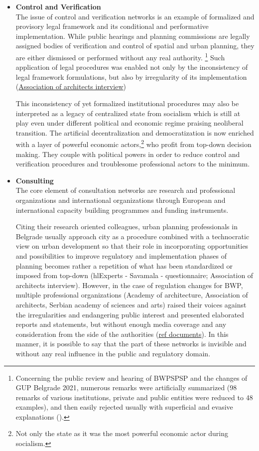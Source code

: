 \documentclass[11pt]{report}
\begin{document}
\begin{itemize}
\item \textbf{Control and Verification}
\\
The issue of control and verification networks is an example of formalized and provisory legal framework and its conditional and performative implementation. While public hearings and planning commissions are legally assigned bodies of verification and control of spatial and urban planning, they are either dismissed or performed without any real authority.
\footnote{Concerning the public review and hearing of BWPSPSP and the changes of GUP Belgrade 2021, numerous remarks were artificially summarized (98 remarks of various institutions, private and public entities were reduced to 48 examples), and then easily rejected usually with superficial and evasive explanations (\cite{Alternativni izvestaj}).}
Such application of legal procedures was enabled  not only by the inconsistency of legal framework formulations, but also by irregularity of its implementation (\href{}{Association of architects interview})

This inconsistency of yet formalized institutional procedures may also be interpreted as a legacy of centralized state from socialism which is still at play even under different political and economic regime praising neoliberal transition.
The artificial decentralization and democratization is now enriched with a layer of powerful economic actors,\footnote{Not only the state as it was  the most powerful economic actor during socialism.}
who profit from top-down decision making.
They couple with political powers in order to reduce control and verification procedures and troublesome professional actors to the minimum.
\\

\item \textbf{Consulting}
\\
The core element of consultation networks are research and professional organizations and international organizations through European and international capacity building programmes and funding instruments.

Citing their research oriented colleagues, urban planning professionals in Belgrade usually approach city as a procedure combined with a technocratic view on urban development so that their role in incorporating opportunities and possibilities to improve regulatory and implementation phases of planning becomes rather a repetition of what has been standardized or imposed from top-down (hl{Experts - Savamala - questionnaire; Association of architects interview}).
However, in the case of regulation changes for BWP, multiple professional organizations (Academy of architecture, Association of architects, Serbian academy of sciences and arts) raised their voices against the irregularities and endangering public interest and presented elaborated reports and statements, but without enough media coverage and any consideration from the side of the authorities (\href{}{ref documents}).
In this manner, it is possible to say that the part of these networks is invisible and without any real influence in the public and regulatory domain.


\end{itemize}
\end{document}
